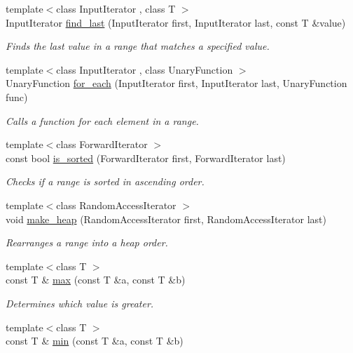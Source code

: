 \begin{DoxyCompactItemize}
{\footnotesize template$<$class Input\+Iterator , class T $>$ }\\Input\+Iterator \hyperlink{namespaceprism_a3189014b9fa31e0ef0d1933c6f616618}{find\+\_\+last} (Input\+Iterator first, Input\+Iterator last, const T \&value)
\begin{DoxyCompactList}\small\item\em Finds the last value in a range that matches a specified value. \end{DoxyCompactList}\item 
{\footnotesize template$<$class Input\+Iterator , class Unary\+Function $>$ }\\Unary\+Function \hyperlink{namespaceprism_a9f65de889707907c02a325d8a4ff4aec}{for\+\_\+each} (Input\+Iterator first, Input\+Iterator last, Unary\+Function func)
\begin{DoxyCompactList}\small\item\em Calls a function for each element in a range. \end{DoxyCompactList}\item 
{\footnotesize template$<$class Forward\+Iterator $>$ }\\const bool \hyperlink{namespaceprism_acf5efbeb096446c47690b9e8bd2cc01a}{is\+\_\+sorted} (Forward\+Iterator first, Forward\+Iterator last)
\begin{DoxyCompactList}\small\item\em Checks if a range is sorted in ascending order. \end{DoxyCompactList}\item 
{\footnotesize template$<$class Random\+Access\+Iterator $>$ }\\void \hyperlink{namespaceprism_af8e36230e6cb92a41aaca282772a9e6e}{make\+\_\+heap} (Random\+Access\+Iterator first, Random\+Access\+Iterator last)
\begin{DoxyCompactList}\small\item\em Rearranges a range into a heap order. \end{DoxyCompactList}\item 
{\footnotesize template$<$class T $>$ }\\const T \& \hyperlink{namespaceprism_a812456273adfa37979e79f07e731d412}{max} (const T \&a, const T \&b)
\begin{DoxyCompactList}\small\item\em Determines which value is greater. \end{DoxyCompactList}\item 
{\footnotesize template$<$class T $>$ }\\const T \& \hyperlink{namespaceprism_a10aff0aca673fb1837069dd8967e4738}{min} (const T \&a, const T \&b)

\end{DoxyCompactItemize}

